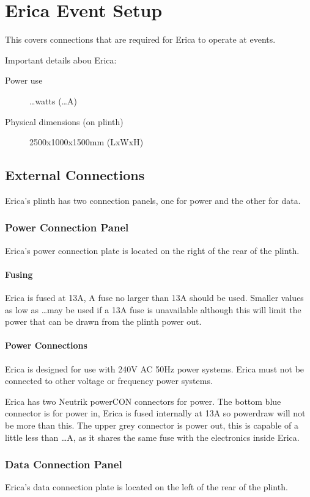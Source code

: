 \chapter{Erica Event Setup}
This covers connections that are required for Erica to operate at events.

Important details abou Erica:
\begin{description}
	\item[Power use]{\dots watts (\dots A)}
	\item[Physical dimensions (on plinth)]{2500x1000x1500mm (LxWxH)}
\end{description}


\section{External Connections}
Erica's plinth has two connection panels, one for power and the other for data.


\subsection{Power Connection Panel}
Erica's power connection plate is located on the right of the rear of the plinth.


\subsubsection{Fusing}
Erica is fused at 13A, A fuse no larger than 13A should be used. Smaller values as low as \dots may be used if a 13A fuse is unavailable although this will limit the power that can be drawn from the plinth power out.


\subsubsection{Power Connections}
Erica is designed for use with 240V AC 50Hz power systems. Erica must not be connected to other voltage or frequency power systems. 

Erica has two Neutrik powerCON connectors for power. The bottom blue connector is for power in, Erica is fused internally at 13A so powerdraw will not be more than this.  The upper grey connector is power out, this is capable of a little less than \dots A, as it shares the same fuse with the electronics inside Erica.


\subsection{Data Connection Panel}
Erica's data connection plate is located on the left of the rear of the plinth.

